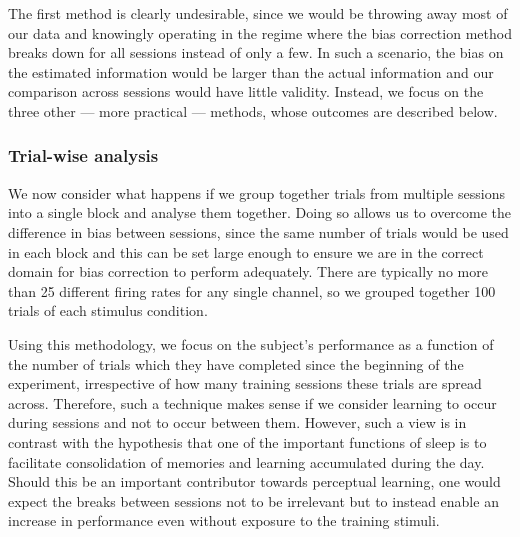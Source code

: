 The first method is clearly undesirable, since we would be throwing away most of our data and knowingly operating in the regime where the bias correction method breaks down for all sessions instead of only a few.
In such a scenario, the bias on the estimated information would be larger than the actual information and our comparison across sessions would have little validity.
Instead, we focus on the three other --- more practical --- methods, whose outcomes are described below.


\subsubsection{Trial-wise analysis}

We now consider what happens if we group together trials from multiple sessions into a single block and analyse them together.
Doing so allows us to overcome the difference in bias between sessions, since the same number of trials would be used in each block and this can be set large enough to ensure we are in the correct domain for bias correction to perform adequately.
There are typically no more than \num{25} different firing rates for any single channel, so we grouped together \num{100} trials of each stimulus condition.

Using this methodology, we focus on the subject's performance as a function of the number of trials which they have completed since the beginning of the experiment, irrespective of how many training sessions these trials are spread across.
Therefore, such a technique makes sense if we consider learning to occur during sessions and not to occur between them.
However, such a view is in contrast with the hypothesis that one of the important functions of sleep is to facilitate consolidation of memories and learning accumulated during the day.
Should this be an important contributor towards perceptual learning, one would expect the breaks between sessions not to be irrelevant but to instead enable an increase in performance even without exposure to the training stimuli.


